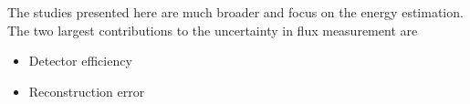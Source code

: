 \documentclass{article}
\begin{document}
The studies presented here are much broader and focus on the energy estimation.  The two largest contributions to the uncertainty in flux measurement are

\begin{itemize}
\item Detector efficiency
\item Reconstruction error
\end{itemize}






\end{document}
